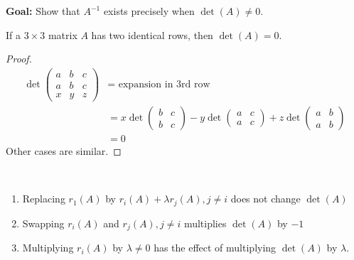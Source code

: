\documentclass[10pt]{scrartcl}
\begin{document}
\textbf{Goal:} Show that $A^{-1}$ exists precisely when $\det(A) \neq 0$.

\begin{lemma}
If a $3 \times 3$ matrix $A$ has two identical rows, then $\det(A) = 0$. 	
\end{lemma}
\begin{proof}
\begin{align*}
  \det\begin{pmatrix}
a & b & c \\ a & b & c\\ x & y & z	
\end{pmatrix} &= \text{ expansion in 3rd row}\\
&= x\det\begin{pmatrix}
b & c\\ b & c	
\end{pmatrix} - y\det\begin{pmatrix}
	a & c\\ a & c
\end{pmatrix}
+ z \det\begin{pmatrix}
a & b \\ a& b	
\end{pmatrix}\\
&= 0
\end{align*}
Other cases are similar. 	
\end{proof}

\begin{proposition}~\\[-0.1cm]
\begin{enumerate}
\item Replacing $r_1(A)$ by $r_i(A) + \lambda r_j(A), j \neq i$ does not change $\det(A)$
\item Swapping $r_i(A)$ and $r_j(A), j \neq i$ multiplies $\det(A)$ by $-1$
\item Multiplying $r_i(A)$ by $\lambda \neq 0$ has the effect of multiplying $\det(A)$ by $\lambda$.
\end{enumerate}
\end{proposition}
\end{document}
